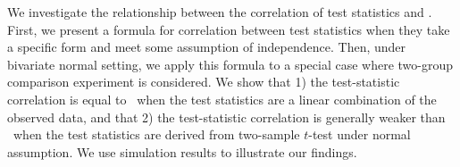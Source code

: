 








We investigate the relationship between the correlation of test
statistics and \popucor.  First, we present a formula for correlation between
test statistics when they take a specific form and meet some assumption of
independence. Then, under bivariate normal setting, we apply this formula to a
special case where two-group comparison experiment is considered. We show that
1) the test-statistic correlation is equal to \popucor~when the test
statistics are a linear combination of the observed data, and that 2) the test-statistic 
correlation is generally weaker  
than \popucor~when the test statistics are derived from two-sample $t$-test under normal
assumption. We use simulation results to illustrate our findings.







